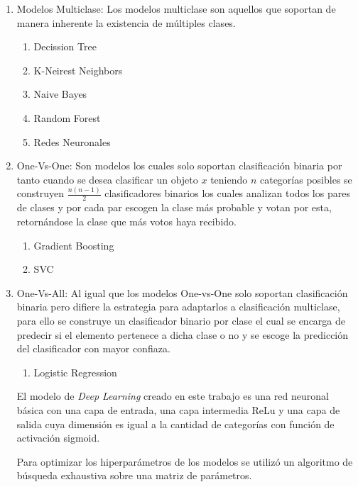 \documentclass[a4paper,10pt,twocolumn]{article}
\begin{document}
	\begin{enumerate}
		
		\item Modelos Multiclase: Los modelos multiclase son aquellos que soportan de manera 
		inherente la existencia de m\'ultiples clases.
		\begin{enumerate}
			\item Decission Tree
   			\item K-Neirest Neighbors
      		\item Naive Bayes
        	\item Random Forest
         	\item Redes Neuronales 
		\end{enumerate}
		
		
		\item One-Vs-One: Son modelos los cuales solo soportan clasificaci\'on binaria
		por tanto cuando se desea clasificar un objeto $x$ teniendo $n$ categor\'ias posibles
		se construyen $\frac{n(n-1)}{2}$ clasificadores binarios los cuales analizan todos los
		pares de clases y por cada par escogen la clase m\'as probable y votan por esta, retorn\'andose
		la clase que m\'as votos haya recibido. 
		\begin{enumerate}
			\item Gradient Boosting
   			\item SVC
		\end{enumerate}
	 
		\item One-Vs-All: Al igual que los modelos One-vs-One solo soportan clasificaci\'on binaria pero difiere
		la estrategia para adaptarlos a clasificaci\'on multiclase, para ello se construye un clasificador binario
		por clase el cual se encarga de predecir si el elemento pertenece a dicha clase o no y se escoge la
		predicci\'on del clasificador con mayor confiaza. 
		\begin{enumerate}
			\item Logistic Regression
		\end{enumerate}

		El modelo de \textit{Deep Learning} creado en este trabajo es una red neuronal b\'asica con 
		una capa de entrada, una capa intermedia ReLu y una capa de salida cuya dimensi\'on
		es igual a la cantidad de categor\'ias con funci\'on de activaci\'on sigmoid.

		Para optimizar los hiperpar\'ametros de los modelos se utiliz\'o un algoritmo de
		b\'usqueda exhaustiva sobre una matriz de par\'ametros.

	\end{enumerate}
\end{document}
